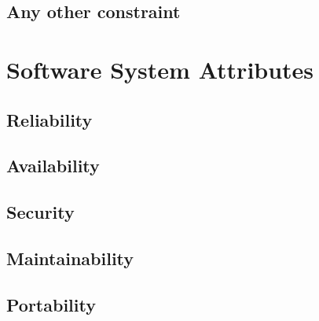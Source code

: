 \subsection{Any other constraint}\label{subsec:any_other_constraint}


\section{Software System Attributes}\label{sec:software_system_attributes}

\subsection{Reliability}\label{subsec:reliability}

\subsection{Availability}\label{subsec:availability}

\subsection{Security}\label{subsec:security}

\subsection{Maintainability}\label{subsec:maintainability}

\subsection{Portability}\label{subsec:portability}